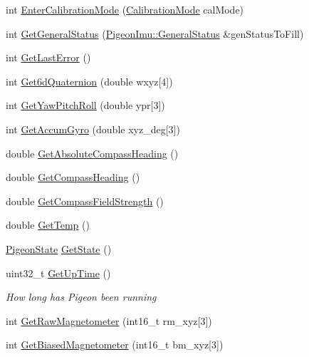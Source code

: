 \begin{DoxyCompactItemize}
\item 
int \hyperlink{class_pigeon_imu_a5fbb5eb21a0d6788813a669ba57cf9a3}{Enter\+Calibration\+Mode} (\hyperlink{class_pigeon_imu_a1d73ea84ad5c812e809698fab0b9b490}{Calibration\+Mode} cal\+Mode)
\item 
int \hyperlink{class_pigeon_imu_aa27a78789526123878a66cccf426b904}{Get\+General\+Status} (\hyperlink{struct_pigeon_imu_1_1_general_status}{Pigeon\+Imu\+::\+General\+Status} \&gen\+Status\+To\+Fill)
\item 
int \hyperlink{class_pigeon_imu_acde1b893859cea0b5b2661f503f804ee}{Get\+Last\+Error} ()
\item 
int \hyperlink{class_pigeon_imu_a11a9f6bd0c9816cc0dae30db8f54e248}{Get6d\+Quaternion} (double wxyz\mbox{[}4\mbox{]})
\item 
int \hyperlink{class_pigeon_imu_a56f727c87eebb80d0c3803f95137d72d}{Get\+Yaw\+Pitch\+Roll} (double ypr\mbox{[}3\mbox{]})
\item 
int \hyperlink{class_pigeon_imu_aafa8dc4f3e5e9e913e1baa46b68cba4e}{Get\+Accum\+Gyro} (double xyz\+\_\+deg\mbox{[}3\mbox{]})
\item 
double \hyperlink{class_pigeon_imu_a04fa177dcd2e2cdd2ca3632ee6d8e844}{Get\+Absolute\+Compass\+Heading} ()
\item 
double \hyperlink{class_pigeon_imu_ae867b4c973dd80f987da8b99c2d22a34}{Get\+Compass\+Heading} ()
\item 
double \hyperlink{class_pigeon_imu_a4bc8fe4ec2588f34057f10f0964eb103}{Get\+Compass\+Field\+Strength} ()
\item 
double \hyperlink{class_pigeon_imu_a3645bd88a064fec619e01b90e0f525d7}{Get\+Temp} ()
\item 
\hyperlink{class_pigeon_imu_af08e19459beb068e840719205fa46c39}{Pigeon\+State} \hyperlink{class_pigeon_imu_aba2f25e640cd9bd4fcf543c3ab3a5781}{Get\+State} ()
\item 
uint32\+\_\+t \hyperlink{class_pigeon_imu_a97595383793dcf68a68ed22c17a39301}{Get\+Up\+Time} ()
\begin{DoxyCompactList}\small\item\em How long has Pigeon been running \end{DoxyCompactList}\item 
int \hyperlink{class_pigeon_imu_a32d122b8d60a864feaac7e755ab7b70b}{Get\+Raw\+Magnetometer} (int16\+\_\+t rm\+\_\+xyz\mbox{[}3\mbox{]})
\item 
int \hyperlink{class_pigeon_imu_aea56b7ed6eba44a7426209c718ae5c69}{Get\+Biased\+Magnetometer} (int16\+\_\+t bm\+\_\+xyz\mbox{[}3\mbox{]})

\end{DoxyCompactItemize}
